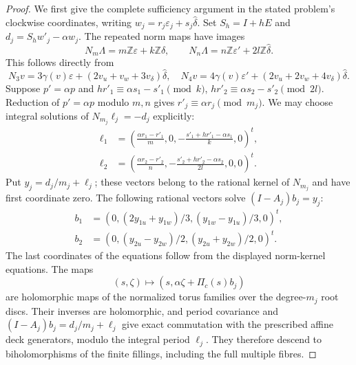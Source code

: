\begin{proof}
We first give the complete sufficiency argument in the stated problem's
clockwise coordinates, writing $w_j=r_j\varepsilon_j+s_j\widehat\delta$.
Set $S_h=I+hE$ and $d_j=S_hw'_j-\alpha w_j$.
The repeated norm maps have images
\[
 N_m\Lambda=m\mathbb Z\varepsilon+k\mathbb Z\widehat\delta,
 \qquad
 N_n\Lambda=n\mathbb Z\varepsilon'+2l\mathbb Z\widehat\delta.
\]
This follows directly from
\[
 N_3v=3\gamma(v)\varepsilon+(2v_u+v_w+3v_\delta)\widehat\delta,
 \quad
 N_4v=4\gamma(v)\varepsilon'+(2v_u+2v_w+4v_\delta)\widehat\delta.
\]
Suppose $p'=\alpha p$ and
$hr'_1\equiv\alpha s_1-s'_1\pmod k$,
$hr'_2\equiv\alpha s_2-s'_2\pmod{2l}$.
Reduction of $p'=\alpha p$ modulo $m,n$ gives
$r'_j\equiv\alpha r_j\pmod{m_j}$.
We may choose integral solutions of $N_{m_j}\ell_j=-d_j$ explicitly:
\[
 \begin{split}
 \ell_1&=\left(\frac{\alpha r_1-r'_1}{m},0,
 -\frac{s'_1+hr'_1-\alpha s_1}{k},0\right)^t,\\
 \ell_2&=\left(\frac{\alpha r_2-r'_2}{n},
 -\frac{s'_2+hr'_2-\alpha s_2}{2l},0,0\right)^t.
 \end{split}
\]
Put $y_j=d_j/m_j+\ell_j$; these vectors belong to the rational
kernel of $N_{m_j}$ and have first coordinate zero.
The following rational vectors solve $(I-A_j)b_j=y_j$:
\[
 \begin{split}
 b_1&=(0,(2y_{1u}+y_{1w})/3,(y_{1w}-y_{1u})/3,0)^t,\\
 b_2&=(0,(y_{2u}-y_{2w})/2,(y_{2u}+y_{2w})/2,0)^t.
 \end{split}
\]
The last coordinates of the equations follow from the displayed
norm-kernel equations.  The maps
\[
 (s,\zeta)\longmapsto(s,\alpha\zeta+\Pi_c(s)b_j)
\]
are holomorphic maps of the normalized torus families over the
degree-$m_j$ root discs.  Their inverses are holomorphic, and period
covariance and $(I-A_j)b_j=d_j/m_j+\ell_j$ give exact commutation
with the prescribed affine deck generators, modulo the integral
period $\ell_j$.  They therefore descend to biholomorphisms of the
finite fillings, including the full multiple fibres.


\end{proof}
